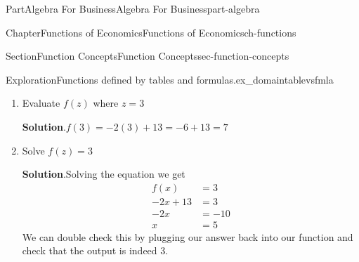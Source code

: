 \documentclass{tufte-book}
\newcommand{\blocktitlefont}{\relax}
\numberwithin{equation}{chapter}
\newcommand{\amp}{&}
\begin{document}
\begin{partptx}{Part}{Algebra For Business}{}{Algebra For Business}{}{}{part-algebra}
\begin{chapterptx}{Chapter}{Functions of Economics}{}{Functions of Economics}{}{}{ch-functions}
\begin{sectionptx}{Section}{Function Concepts}{}{Function Concepts}{}{}{sec-function-concepts}
\begin{exploration}{Exploration}{Functions defined by tables and formulas.}{ex_domaintablevsfmla}
\begin{enumerate}[font=\bfseries,label=(\alph*),ref=\alph*]
\begin{enumerate}[font=\bfseries,label=(\roman*),ref=\theenumi.\roman*]
\noindent\textbf{\blocktitlefont Solution}.\hypertarget{ex_domaintablevsfmla-4-3-2}{}\quad{}We can solve the inequality as follows%
\begin{align*}
f(x) \amp > 0 \\
-2x + 13 \amp > 0\\
13 \amp > 2x \amp \text{add } 2x\text{ to both sides} \\
6.5 \amp > x \amp \text{divide by positive 2}
\end{align*}
We can also look at the graph of our function, draw the line \(y=0\), and take all \(x\) values where the function is above the line. From the graph below, this is the set of \(x\) to the left of 6.5.  In interval notation, this is%
\begin{equation*}
\Big(-\infty, 6.5\Big)
\end{equation*}
%
\begin{image}{0.25}{0.5}{0.25}{}%
%
\end{image}%
\item{}Evaluate \(f(z)\) where \(z=3\)%
\par\smallskip%
\noindent\textbf{\blocktitlefont Solution}.\hypertarget{ex_domaintablevsfmla-4-4-2}{}\quad{}\(f(3) = -2(3) + 13 = -6 + 13 = 7\)%
\item{}Solve \(f(z)=3\)%
\par\smallskip%
\noindent\textbf{\blocktitlefont Solution}.\hypertarget{ex_domaintablevsfmla-4-5-2}{}\quad{}Solving the equation we get%
\begin{align*}
f(x) \amp = 3\\
-2x+13\amp = 3\\
-2x    \amp = -10\\
x \amp = 5
\end{align*}
We can double check this by plugging our answer back into our function and check that the output is indeed \(3\).%
\end{enumerate}%
\end{enumerate}%

\end{exploration}
\end{sectionptx}
\end{chapterptx}
\end{partptx}
\end{document}
